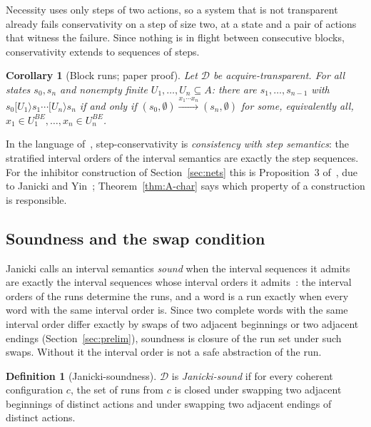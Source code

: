 \documentclass[preprint,12pt]{elsarticle}
\theoremstyle{plain}
\newtheorem{corollary}[theorem]{Corollary}
\theoremstyle{definition}
\newtheorem{definition}[theorem]{Definition}
\newcommand{\steparrow}[1]{\mathrel{[#1\rangle}}
\newcommand{\istep}[1]{\xrightarrow{#1}}
\newcommand{\BE}[1]{#1^{\mathit{BE}}}
\newcommand{\D}{\mathcal{D}}
\begin{document}
Necessity uses only steps of two actions, so a system that is not transparent already fails conservativity on a step of size two, at a state and a pair of actions that witness the failure. Since nothing is in flight between consecutive blocks, conservativity extends to sequences of steps.

\begin{corollary}[Block runs; paper proof]
\label{cor:blocks}
Let $\D$ be acquire-transparent. For all states $s_0, s_n$ and nonempty finite $U_1, \dots, U_n \subseteq A$: there are $s_1, \dots, s_{n-1}$ with $s_0 \steparrow{U_1} s_1 \cdots \steparrow{U_n} s_n$ if and only if $(s_0, \emptyset) \istep{x_1 \cdots x_n} (s_n, \emptyset)$ for some, equivalently all, $x_1 \in \BE{U_1}, \dots, x_n \in \BE{U_n}$.
\end{corollary}

In the language of~\cite{Janicki2019}, step-conservativity is \emph{consistency with step semantics}: the stratified interval orders of the interval semantics are exactly the step sequences. For the inhibitor construction of Section~\ref{sec:nets} this is Proposition~3 of~\cite{AlqarniJanicki2018}, due to Janicki and Yin~\cite{JanickiYin2017}; Theorem~\ref{thm:A-char} says which property of a construction is responsible.

\subsection{Soundness and the swap condition}

Janicki calls an interval semantics \emph{sound} when the interval sequences it admits are exactly the interval sequences whose interval orders it admits~\cite[Sect.~2.4]{Janicki2019}: the interval orders of the runs determine the runs, and a word is a run exactly when every word with the same interval order is. Since two complete words with the same interval order differ exactly by swaps of two adjacent beginnings or two adjacent endings (Section~\ref{sec:prelim}), soundness is closure of the run set under such swaps. Without it the interval order is not a safe abstraction of the run.

\begin{definition}[Janicki-soundness]
\label{def:jsound}
$\D$ is \emph{Janicki-sound} if for every coherent configuration $c$, the set of runs from $c$ is closed under swapping two adjacent beginnings of distinct actions and under swapping two adjacent endings of distinct actions.
\end{definition}
\end{document}
